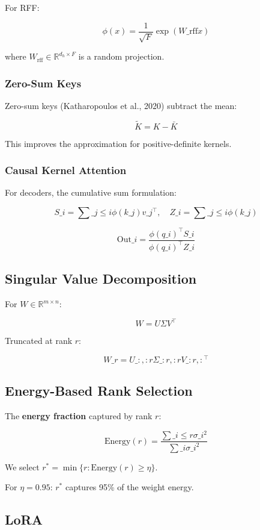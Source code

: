 For RFF:

\[
\phi(x) = \frac{1}{\sqrt{F}} \exp\!\left(W\_\text{rff} x\right)
\]

where $W_\text{rff} \in \mathbb{R}^{d_h \times F}$ is a random projection.

\subsubsection{Zero-Sum Keys}

Zero-sum keys (Katharopoulos et al., 2020) subtract the mean:

\[
\tilde{K} = K - \bar{K}
\]

This improves the approximation for positive-definite kernels.

\subsubsection{Causal Kernel Attention}

For decoders, the cumulative sum formulation:

\[
S\_i = \sum\_{j \leq i} \phi(k\_j) v\_j^\top, \quad
Z\_i = \sum\_{j \leq i} \phi(k\_j)
\]

\[
\text{Out}\_i = \frac{\phi(q\_i)^\top S\_i}{\phi(q\_i)^\top Z\_i}
\]

\subsection{Singular Value Decomposition}

For $W \in \mathbb{R}^{m \times n}$:

\[
W = U \Sigma V^\top
\]

Truncated at rank $r$:

\[
W\_r = U\_{:, :r} \Sigma\_{:r, :r} V\_{:r, :}^\top
\]

\subsection{Energy-Based Rank Selection}

The \textbf{energy fraction} captured by rank $r$:

\[
\text{Energy}(r) = \frac{\sum\_{i \leq r} \sigma\_i^2}{\sum\_i \sigma\_i^2}
\]

We select $r^* = \min \{ r : \text{Energy}(r) \geq \eta \}$.

For $\eta = 0.95$: $r^*$ captures 95\% of the weight energy.

\subsection{LoRA}

